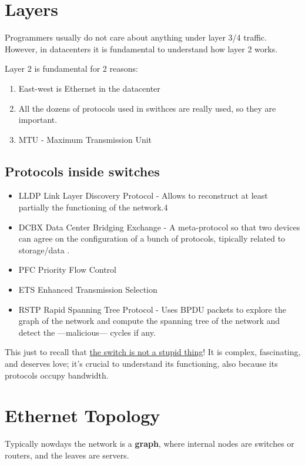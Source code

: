 \section{Layers}
Programmers usually do not care about anything under layer 3/4 traffic.
However, in datacenters it is fundamental to understand how layer 2 works.

Layer 2 is fundamental for 2 reasons:
\begin{enumerate}
   \item East-west is Ethernet in the datacenter
   \item All the dozens of protocols used in swithces are really used, so they are important.
   \item MTU - Maximum Transmission Unit
\end{enumerate}

\subsection{Protocols inside switches}
\begin{itemize}
   \item LLDP Link Layer Discovery Protocol - Allows to reconstruct at least partially the functioning of the network.4
   \item DCBX Data Center Bridging Exchange - A meta-protocol so that two devices can agree on the configuration of a bunch of protocols, tipically related to storage/data 
   .
   \item PFC Priority Flow Control
   \item ETS Enhanced Transmission Selection
   \item RSTP Rapid Spanning Tree Protocol - Uses BPDU packets to explore the graph of the network and compute the spanning tree of the network and detect the ---malicious--- cycles if any.
\end{itemize}

This just to recall that \ul{the switch is not a stupid thing}! It is complex, fascinating, and deserves love; it's crucial to understand its functioning, also because its protocols occupy bandwidth.

\section{Ethernet Topology}
Typically nowdays the network is a \textbf{graph}, where internal nodes are switches or routers, and the leaves are servers.

